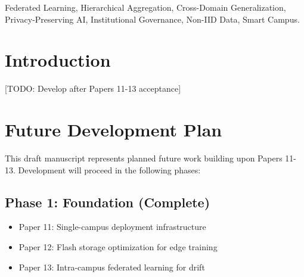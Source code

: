 \documentclass[conference]{IEEEtran}
\begin{document}
\begin{IEEEkeywords}
Federated Learning, Hierarchical Aggregation, Cross-Domain Generalization, Privacy-Preserving AI, Institutional Governance, Non-IID Data, Smart Campus.
\end{IEEEkeywords}

%
%

\section{Introduction}
[TODO: Develop after Papers 11-13 acceptance]


\section{Future Development Plan}

This draft manuscript represents planned future work building upon Papers 11-13. Development will proceed in the following phases:

\subsection{Phase 1: Foundation (Complete)}
\begin{itemize}
    \item Paper 11: Single-campus deployment infrastructure
    \item Paper 12: Flash storage optimization for edge training
    \item Paper 13: Intra-campus federated learning for drift
\end{itemize}
\end{document}
